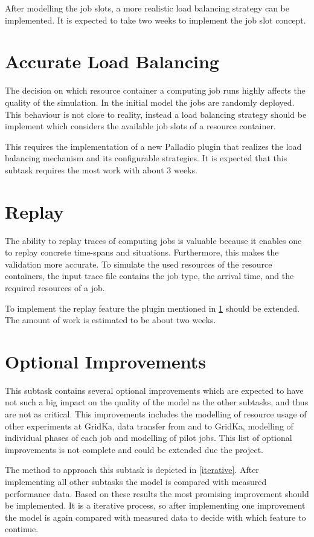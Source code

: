 After modelling the job slots, a more realistic load balancing strategy can be implemented. It is expected to take two weeks to implement the job slot concept. 
\clearpage
\section{Accurate Load Balancing}
\label{scheduling}
The decision on which resource container a computing job runs highly affects the quality of the simulation. In the initial model the jobs are randomly deployed. This behaviour is not close to reality, instead a load balancing strategy should be implement which considers the available job slots of a resource container. 

This requires the implementation of a new Palladio plugin that realizes the load balancing mechanism and its configurable strategies.
It is expected that this subtask requires the most work with about 3 weeks.

\section{Replay}
The ability to replay traces of computing jobs is valuable because it enables one to replay concrete time-spans and situations. Furthermore, this makes the validation more accurate. To simulate the used resources of the resource containers, the input trace file contains the job type, the arrival time, and the required resources of a job.

To implement the replay feature the plugin mentioned in \cref{scheduling} should be extended. The amount of work is estimated to be about two weeks.

\section{Optional Improvements}
This subtask contains several optional improvements which are expected to have not such a big impact on the quality of the model as the other subtasks, and thus are not as critical. This improvements includes the modelling of resource usage of other experiments at GridKa, data transfer from and to GridKa, modelling of individual phases of each job and modelling of pilot jobs.
This list of optional improvements is not complete and could be extended due the project.

The method to approach this subtask is depicted in \cref{iterative}. After implementing all other subtasks the model is compared with measured performance data. Based on these results the most promising improvement should be implemented. It is a iterative process, so after implementing one improvement the model is again compared with measured data to decide with which feature to continue.

